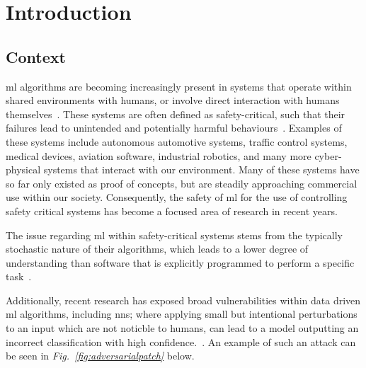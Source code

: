 
\chapter{Introduction} %
\label{Chapter1} %



\section{Context}

\Gls{ml} algorithms are becoming increasingly present in systems that operate within shared environments
with humans, or involve direct interaction with humans themselves~\citep{pereira}. These systems 
are often defined as safety-critical, such that their failures lead to unintended and potentially harmful behaviours~\citep{amodei}.
Examples of these systems include autonomous automotive systems, traffic control systems, medical devices, aviation software, industrial robotics, and many more cyber-physical systems that interact with our environment.
Many of these systems have so far only existed as proof of concepts, but are steadily approaching commercial use within our society.
Consequently, the safety of \gls{ml} for the use of controlling safety critical systems has become a focused area of research in recent years.

The issue regarding \gls{ml} within safety-critical systems stems from the typically stochastic nature of their algorithms, which
leads to a lower degree of understanding than software that is explicitly programmed to perform a specific task~\citep{bishop}.

Additionally, recent research has exposed broad vulnerabilities within data driven \gls{ml} algorithms, including \Glspl{nn}; where applying 
small but intentional perturbations to an input which are not noticble to humans,
can lead to a model outputting an incorrect classification with high confidence.~\citep{goodfellow}.
An example of such an attack can be seen in \textit{Fig.~\ref{fig:adversarialpatch}} below.


